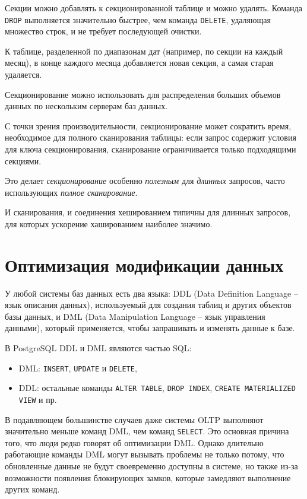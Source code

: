 \documentclass[%
	11pt,
	a4paper,
	utf8,
		]{article}
\begin{document}
Секции можно добавлять к секционированной таблице и можно удалять. Команда \verb|DROP| выполняется значительно быстрее, чем команда \verb|DELETE|, удаляющая множество строк, и не требует последующей очистки.

К таблице, разделенной по диапазонам дат (например, по секции на каждый месяц), в конце каждого месяца добавляется новая секция, а самая старая удаляется.

Секционирование можно использовать для распределения больших объемов данных по нескольким серверам баз данных.

С точки зрения производительности, секционирование может сократить время, необходимое для полного сканирования таблицы: если запрос содержит условия для ключа секционирования, сканирование ограничивается только подходящими секциями. 

Это делает \emph{секционирование} особенно \emph{полезным} для \emph{длинных} запросов, часто использующих \emph{полное сканирование}.

И сканирования, и соединения хешированием типичны для длинных запросов, для которых ускорение хашированием наиболее значимо.

\section{Оптимизация модификации данных}

У любой системы баз данных есть два языка: DDL (Data Definition Language -- язык описания данных), используемый для создания таблиц и других объектов базы данных, и DML (Data Manipulation Language -- язык управления данными), который применяется, чтобы запрашивать и изменять данные к базе.

В PostgreSQL DDL и DML являются частью SQL:
\begin{itemize}
	\item DML: \verb|INSERT|, \verb|UPDATE| и \verb|DELETE|,
	
	\item DDL: остальные команды \verb|ALTER TABLE|, \verb|DROP INDEX|, \verb|CREATE MATERIALIZED VIEW| и пр.
\end{itemize}

В подавляющем большинстве случаев даже системы OLTP выполняют значительно меньше команд DML, чем команд \verb|SELECT|. Это основная причина того, что люди редко говорят об оптимизации DML. Однако длительно работающие команды DML могут вызывать проблемы не только потому, что обновленные данные не будут своевременно доступны в системе, но также из-за возможности появления блокирующих замков, которые замедляют выполнение других команд.
\end{document}
